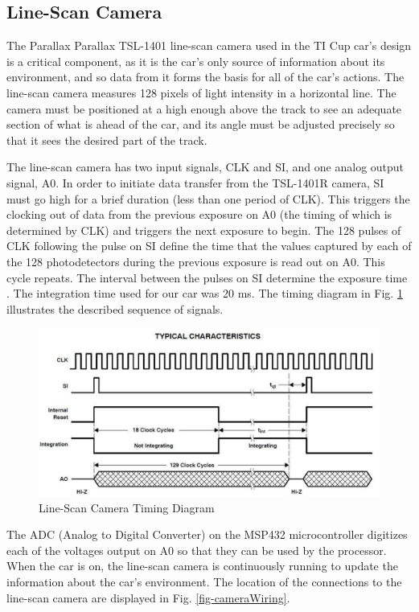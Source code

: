 \documentclass{article}
\begin{document}
\subsection{Line-Scan Camera}
The Parallax Parallax TSL-1401 line-scan camera used in the TI Cup car's design is a critical component, as it is the car's only source of information about its environment, and so data from it forms the basis for all of the car's actions. The line-scan camera measures 128 pixels of light intensity in a horizontal line. The camera must be positioned at a high enough above the track to see an adequate section of what is ahead of the car, and its angle must be adjusted precisely so that it sees the desired part of the track.

The line-scan camera has two input signals, CLK and SI, and one analog output signal, A0. In order to initiate data transfer from the TSL-1401R camera, SI must go high for a brief duration (less than one period of CLK). This triggers the clocking out of data from the previous exposure on A0 (the timing of which is determined by CLK) and triggers the next exposure to begin. The 128 pulses of CLK following the pulse on SI define the time that the values captured by each of the 128 photodetectors during the previous exposure is read out on A0. This cycle repeats. The interval between the pulses on SI determine the exposure time \cite{ourLab6}. The integration time used for our car was 20 ms. The timing diagram in Fig. \ref{fig-camTiming} illustrates the described sequence of signals. 

\begin{figure}[htbp]
    \centering
    \includegraphics[width=\linewidth]{figs/biggerCamTimingDiagram.png}
    \caption{Line-Scan Camera Timing Diagram \cite{cameraTiming}}
    \label{fig-camTiming}
\end{figure}

The ADC (Analog to Digital Converter) on the MSP432 microcontroller digitizes each of the voltages output on A0 so that they can be used by the processor. When the car is on, the line-scan camera is continuously running to update the information about the car's environment. The location of the connections to the line-scan camera are displayed in Fig. \ref{fig-cameraWiring}. 
\end{document}
